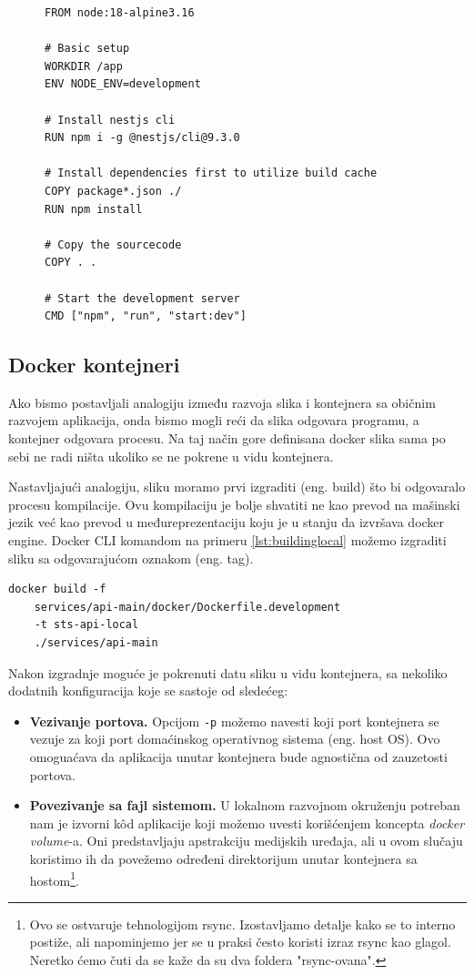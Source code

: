 \documentclass[12pt,oneside]{memoir}
\begin{document}
\begin{figure}[h]
\begin{lstlisting}[language=docker, caption={Slika za bekend server}, label={lst:dockerimgbackendexample}]
FROM node:18-alpine3.16

# Basic setup
WORKDIR /app
ENV NODE_ENV=development

# Install nestjs cli
RUN npm i -g @nestjs/cli@9.3.0

# Install dependencies first to utilize build cache
COPY package*.json ./
RUN npm install

# Copy the sourcecode
COPY . .

# Start the development server
CMD ["npm", "run", "start:dev"]
\end{lstlisting}
\end{figure}

\subsection{Docker kontejneri}

Ako bismo postavljali analogiju između razvoja slika i kontejnera sa običnim razvojem aplikacija, onda bismo mogli reći da slika odgovara programu, a kontejner odgovara procesu. Na taj način gore definisana docker slika sama po sebi ne radi ništa ukoliko se ne pokrene u vidu kontejnera. 

Nastavljajući analogiju, sliku moramo prvi izgraditi (eng. build) što bi odgovaralo procesu kompilacije. Ovu kompilaciju je bolje shvatiti ne kao prevod na mašinski jezik već kao prevod u međureprezentaciju koju je u stanju da izvršava docker engine. Docker CLI komandom na primeru \ref{lst:buildinglocal} možemo izgraditi sliku sa odgovarajućom oznakom (eng. tag).

\newpage
\begin{lstlisting}[caption={Izgradnja slike}, label={lst:buildinglocal}]
docker build -f
    services/api-main/docker/Dockerfile.development 
    -t sts-api-local 
    ./services/api-main 
\end{lstlisting}

Nakon izgradnje moguće je pokrenuti datu sliku u vidu kontejnera, sa nekoliko dodatnih konfiguracija koje se sastoje od sledećeg:
\begin{itemize}
    \item \textbf{Vezivanje portova.} Opcijom \verb|-p| možemo navesti koji port kontejnera se vezuje za koji port domaćinskog operativnog sistema (eng. host OS). Ovo omoguaćava da aplikacija unutar kontejnera bude agnostična od zauzetosti portova.
    \item \textbf{Povezivanje sa fajl sistemom.} U lokalnom razvojnom okruženju potreban nam je izvorni k\^{o}d aplikacije koji možemo uvesti korišćenjem koncepta \textit{docker volume}-a. Oni predstavljaju apstrakciju medijskih uređaja, ali u ovom slučaju koristimo ih da povežemo određeni direktorijum unutar kontejnera sa hostom\footnote{Ovo se ostvaruje tehnologijom rsync. Izostavljamo detalje kako se to interno postiže, ali napominjemo jer se u praksi često koristi izraz rsync kao glagol. Neretko ćemo čuti da se kaže da su dva foldera "rsync-ovana".}.
\end{itemize}
\end{document}
